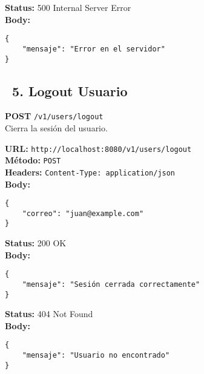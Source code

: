 \begin{tcolorbox}[response]
    \textbf{Status:} 500 Internal Server Error\\
    \textbf{Body:}
    \begin{verbatim}
{
    "mensaje": "Error en el servidor"
}
    \end{verbatim}
\end{tcolorbox}

\subsection*{\faServer\ 5. Logout Usuario}
\begin{tcolorbox}[endpoint]
    \textbf{POST} \texttt{/v1/users/logout}\\
    Cierra la sesión del usuario.
\end{tcolorbox}

\begin{tcolorbox}[request]
    \textbf{URL:} \textcolor{urlColor}{\texttt{http://localhost:8080/v1/users/logout}}\\
    \textbf{Método:} \textcolor{methodColor}{\texttt{POST}}\\
    \textbf{Headers:} \textcolor{headerColor}{\texttt{Content-Type: application/json}}\\
    \textbf{Body:}
    \begin{verbatim}
{
    "correo": "juan@example.com"
}
    \end{verbatim}
\end{tcolorbox}

\begin{tcolorbox}[response]
    \textbf{Status:} 200 OK\\
    \textbf{Body:}
    \begin{verbatim}
{
    "mensaje": "Sesión cerrada correctamente"
}
    \end{verbatim}
\end{tcolorbox}

\begin{tcolorbox}[response]
    \textbf{Status:} 404 Not Found\\
    \textbf{Body:}
    \begin{verbatim}
{
    "mensaje": "Usuario no encontrado"
}
    \end{verbatim}
\end{tcolorbox}

